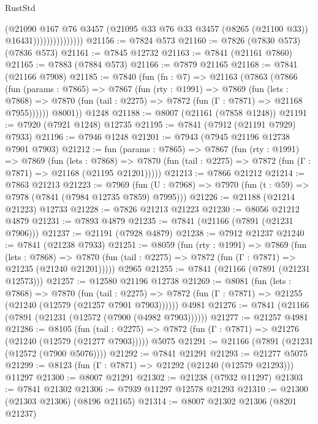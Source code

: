 \begin{lexlean}{RustStd}
\begin{coremodule}
{\begin{coremodule}
{{{{{{{{{{{{{{{{{{{{{{{{{{{{{{{{{{{{{{{{{{{{{{{{{{{{{{                              (@21090
                                @167
                                @76
                                @3457
                                (@21095 @33 @76 @33 @3457 (@8265 (@21100 @33)) @16431)))))))))))))))
@21156 := @7824 @573
@21160 := @7826 (@7830 @573) (@7836 @573)
@21161 := @7845 @12732
@21163 := @7841 (@21161 @7860)
@21165 := @7883 (@7884 @573)
@21166 := @7879 @21165
@21168 := @7841 (@21166 @7908)
@21185 := @7840
    (fun (fn : @7) =>
    @21163
      (@7863
        (@7866
          (fun (params : @7865) =>
          @7867
            (fun (rty : @1991) =>
            @7869
              (fun (lets : @7868) =>
              @7870 (fun (tail : @2275) => @7872 (fun (Γ : @7871) => @21168 @7955))))))
        @8001))
    @1248
@21188 := @8007 (@21161 (@7858 @1248))
@21191 := @7920 (@7921 @1248) @12735
@21195 := @7841 (@7912 (@21191 @7929) @7933)
@21196 := @7946 @1248
@21201 := @7943 (@7945 @21196 @12738 @7901 @7903)
@21212 := fun (params : @7865) =>
  @7867
    (fun (rty : @1991) =>
    @7869
      (fun (lets : @7868) =>
      @7870 (fun (tail : @2275) => @7872 (fun (Γ : @7871) => @21168 (@21195 @21201)))))
@21213 := @7866 @21212
@21214 := @7863 @21213
@21223 := @7969
    (fun (U : @7968) => @7970 (fun (t : @59) => @7978 (@7841 (@7984 @12735 @7859) @7995)))
@21226 := @21188 (@21214 @21223) @12733
@21228 := @7826 @21213 @21223
@21230 := @8056 @21212 @4879
@21231 := @7893 @4879
@21235 := @7841 (@21166 (@7891 (@21231 @7906)))
@21237 := @21191 (@7928 @4879)
@21238 := @7912 @21237
@21240 := @7841 (@21238 @7933)
@21251 := @8059
    (fun (rty : @1991) =>
    @7869
      (fun (lets : @7868) =>
      @7870 (fun (tail : @2275) => @7872 (fun (Γ : @7871) => @21235 (@21240 @21201)))))
    @2965
@21255 := @7841 (@21166 (@7891 (@21231 @12573)))
@21257 := @12580 @21196 @12738
@21269 := @8081
    (fun (lets : @7868) =>
    @7870
      (fun (tail : @2275) =>
      @7872 (fun (Γ : @7871) => @21255 (@21240 (@12579 (@21257 @7901 @7903))))))
    @4981
@21276 := @7841 (@21166 (@7891 (@21231 (@12572 (@7900 (@4982 @7903))))))
@21277 := @21257 @4981
@21286 := @8105
    (fun (tail : @2275) => @7872 (fun (Γ : @7871) => @21276 (@21240 (@12579 (@21277 @7903)))))
    @5075
@21291 := @21166 (@7891 (@21231 (@12572 (@7900 @5076))))
@21292 := @7841 @21291
@21293 := @21277 @5075
@21299 := @8123 (fun (Γ : @7871) => @21292 (@21240 (@12579 @21293))) @11297
@21300 := @8007 @21291
@21302 := @21238 (@7932 @11297)
@21303 := @7841 @21302
@21306 := @7939 @11297 @12578 @21293
@21310 := @21300 (@21303 @21306) (@8196 @21165)
@21314 := @8007 @21302 @21306 (@8201 @21237)
}}}}}}}}}}}}}}}}}}}}}}}}}}}}}}}}}}}}}}}}}}}}}}}}}}}}}}
\end{coremodule}}
\end{coremodule}
\end{lexlean}
